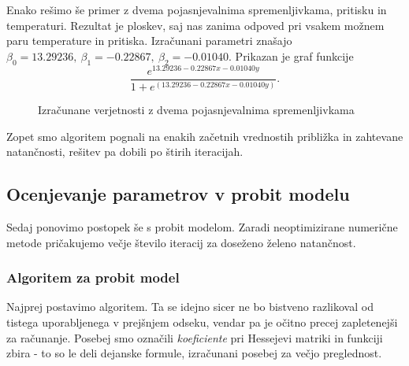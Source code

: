 \documentclass[12pt,a4paper]{amsart}
\theoremstyle{definition} %
\theoremstyle{plain} %
\begin{document}
Enako rešimo še primer z dvema pojasnjevalnima spremenljivkama, pritisku in temperaturi. Rezultat je ploskev, saj nas zanima odpoved pri vsakem možnem
paru temperature in pritiska. Izračunani parametri znašajo $\beta_{0} = 13.29236,~\beta_{1} = -0.22867,~\beta_{2} = -0.01040.$ Prikazan je graf funkcije
\[
    \frac{e^{13.29236 -0.22867x-0.01040y}}{1+e^{(13.29236 -0.22867x-0.01040y)}}.
\]
\begin{center}
\begin{figure}[H]
\caption{Izračunane verjetnosti z dvema pojasnjevalnima spremenljivkama}
\end{figure}
\end{center}
Zopet smo algoritem pognali na enakih začetnih vrednostih približka in zahtevane natančnosti, rešitev pa dobili po štirih iteracijah.

\subsection{Ocenjevanje parametrov v probit modelu}
Sedaj ponovimo postopek še s probit modelom. Zaradi neoptimizirane numerične metode pričakujemo večje število iteracij za doseženo želeno natančnost.

\subsubsection{Algoritem za probit model}
Najprej postavimo algoritem. Ta se idejno sicer ne bo bistveno razlikoval od tistega uporabljenega v prejšnjem odseku, vendar pa je očitno precej zapletenejši za računanje.
Posebej smo označili \textit{koeficiente} pri Hessejevi matriki in funkciji zbira - to so le deli dejanske formule, izračunani posebej za večjo preglednost.
\end{document}
